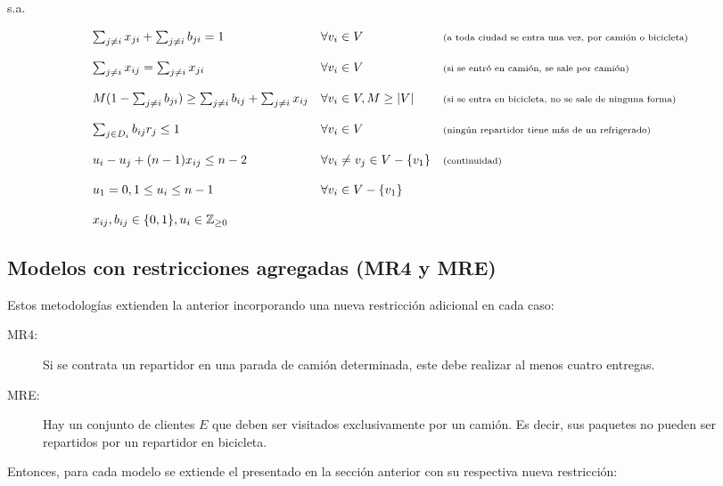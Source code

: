 \documentclass[10pt]{article}
\begin{document}
	s.a.

	\[
	\begin{array}{l l l}
		\sum_{j \neq i} x_{ji} + \sum_{j \neq i} b_{ji} = 1 & \forall v_i \in V & \text{\scriptsize (a toda ciudad se entra una vez, por camión o bicicleta)} \\
		\\
		\sum_{j \neq i} x_{ij} = \sum_{j\neq i} x_{ji} & \forall v_i \in V & \text{\scriptsize (si se entró en camión, se sale por camión)} \\
		\\
		M(1 - \sum_{j \neq i} b_{ji}) \geq \sum_{j \neq i} b_{ij} + \sum_{j \neq i} x_{ij} & \forall v_i \in V, M \geq |V| & \text{\scriptsize (si se entra en bicicleta, no se sale de ninguna forma)} \\
		\\
		\sum_{j \in D_i} b_{ij} r_j \leq 1 & \forall v_i \in V & \text{\scriptsize (ningún repartidor tiene más de un refrigerado)} \\
		\\
		u_i - u_j + (n - 1) x_{ij} \leq n - 2 & \forall v_i \neq v_j \in V - \{v_1\} & \text{\scriptsize (continuidad)} \\
		\\
		u_1 = 0, 1 \leq u_i \leq n-1 & \forall v_i \in V - \{v_1\} \\
		\\
		x_{ij}, b_{ij} \in \{0,1\}, u_i \in \mathbb{Z}_{\geq 0}
	\end{array}
	\]
	
	
	
	\subsection{Modelos con restricciones agregadas (MR4 y MRE)}
	
	Estos metodologías extienden la anterior incorporando una nueva restricción adicional en cada caso:
	
	\begin{description}
		\item[MR4:] Si se contrata un repartidor en una parada de camión determinada, este debe realizar al menos cuatro entregas.
		\item[MRE:] Hay un conjunto de clientes $E$ que deben ser visitados exclusivamente por un camión. Es decir, sus paquetes no pueden ser repartidos por un repartidor en bicicleta.
	\end{description}
	
	Entonces, para cada modelo se extiende el presentado en la sección anterior con su respectiva nueva restricción:
	
\end{document}
